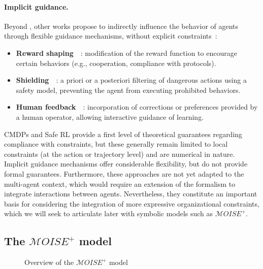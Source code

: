         \paragraph{Implicit guidance.}
        Beyond , other works propose to indirectly influence
        the behavior of agents through flexible guidance mechanisms,
        without explicit constraints~:
        \begin{itemize}
          \item \textbf{Reward shaping}~\cite{ng1999policy}~: modification of the
                reward function to encourage certain behaviors (e.g., cooperation,
                compliance with protocols).
          \item \textbf{Shielding}~\cite{amodei2016concrete}~: a priori or a posteriori filtering
                of dangerous actions using a safety model,
                preventing the agent from executing prohibited behaviors.
          \item \textbf{Human feedback}~\cite{warnell2018deep}~: incorporation of corrections
                or preferences provided by a human operator,
                allowing interactive guidance of learning.
        \end{itemize}

        CMDPs and Safe RL provide a first level of theoretical guarantees regarding compliance with constraints, but these generally remain limited to local constraints (at the action or trajectory level) and are numerical in nature. Implicit guidance mechanisms offer considerable flexibility, but do not provide formal guarantees. Furthermore, these approaches are not yet adapted to the multi-agent context, which would require an extension of the formalism to integrate interactions between agents. Nevertheless, they constitute an important basis for considering the integration of more expressive organizational constraints, which we will seek to articulate later with symbolic models such as $\mathcal{M}OISE^+$.

        \subsection{The $\mathcal{M}OISE^+$ model}

        \begin{figure}[h!]
          \centering
          
          \caption{Overview of the $\mathcal{M}OISE^+$ model}
          \label{fig:moise_model}
        \end{figure}

